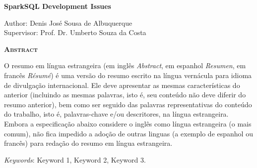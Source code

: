 \begin{center}
	{\Large{\textbf{SparkSQL Development Issues}}}
\end{center}

\vspace{1cm}

\begin{flushright}
	Author: Denis José Sousa de Albuquerque\\
	Supervisor: Prof. Dr. Umberto Souza da Costa
\end{flushright}

\vspace{1cm}

\begin{center}
	\Large{\textsc{\textbf{Abstract}}}
\end{center}

\noindent O resumo em língua estrangeira (em inglês \textit{Abstract}, em espanhol \textit{Resumen}, em francês \textit{Résumé}) é uma versão do resumo escrito na língua vernácula para idioma de divulgação internacional. Ele deve apresentar as mesmas características do anterior (incluindo as mesmas palavras, isto é, seu conteúdo não deve diferir do resumo anterior), bem como ser seguido das palavras representativas do conteúdo do trabalho, isto é, palavras-chave e/ou descritores, na língua estrangeira. Embora a especificação abaixo considere o inglês como língua estrangeira (o mais comum), não fica impedido a adoção de outras linguas (a exemplo de espanhol ou francês) para redação do resumo em língua estrangeira.

\noindent\textit{Keywords}: Keyword 1, Keyword 2, Keyword 3.